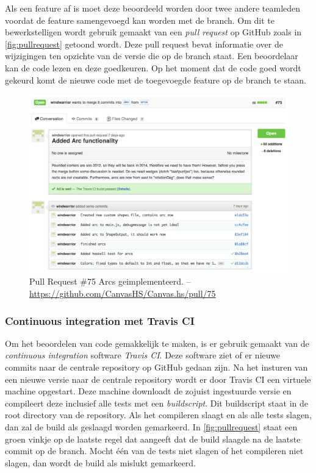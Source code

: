 Als een feature af is moet deze beoordeeld worden door twee andere teamleden voordat de feature samengevoegd kan worden met de  branch. Om dit te bewerkstelligen wordt gebruik gemaakt van een \emph{pull request} op GitHub zoals in \autoref{fig:pullrequest} getoond wordt. Deze pull request bevat informatie over de wijzigingen ten opzichte van de versie die op de  branch staat. Een beoordelaar kan de code lezen en deze goedkeuren. Op het moment dat de code goed wordt gekeurd komt de nieuwe code met de toegevoegde feature op de  branch te staan.

\begin{figure}
\begin{center}
\includegraphics[keepaspectratio,width=\textwidth]{./images/pullrequest.png}
\caption{Pull Request \#75 Arcs geimplementeerd. – \url{https://github.com/CanvasHS/Canvas.hs/pull/75}}
\label{fig:pullrequest}
\end{center}
\end{figure}

\subsubsection{Continuous integration met Travis CI}
Om het beoordelen van code gemakkelijk te maken, is er gebruik gemaakt van de \emph{continuous integration} software \emph{Travis CI}. Deze software ziet of er nieuwe commits naar de centrale repository op GitHub gedaan zijn. Na het insturen van een nieuwe versie naar de centrale repository wordt er door Travis CI een virtuele machine opgestart. Deze machine downloadt de zojuist ingestuurde versie en compileert deze inclusief alle tests met een \emph{buildscript}. Dit buildscript staat in de root directory van de repository. Als het compileren slaagt en als alle tests slagen, dan zal de build als geslaagd worden gemarkeerd. In \autoref{fig:pullrequest} staat een groen vinkje op de laatste regel dat aangeeft dat de build slaagde na de laatste commit op de  branch. Mocht één van de tests niet slagen of het compileren niet slagen, dan wordt de build als mislukt gemarkeerd.

